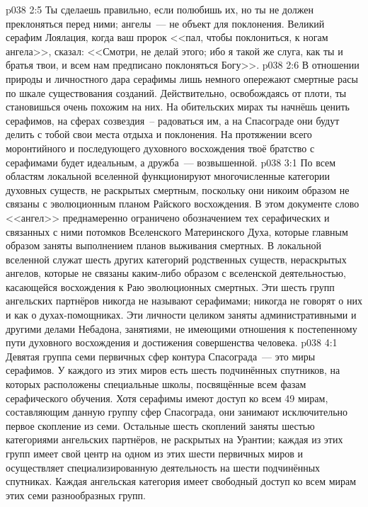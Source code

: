 \vs p038 2:5 \pc Ты сделаешь правильно, если полюбишь их, но ты не должен преклоняться перед ними; ангелы~--- не объект для поклонения. Великий серафим Лоялация, когда ваш пророк <<пал, чтобы поклониться, к ногам ангела>>, сказал: <<Смотри, не делай этого; ибо я такой же слуга, как ты и братья твои, и всем нам предписано поклоняться Богу>>.
\vs p038 2:6 В отношении природы и личностного дара серафимы лишь немного опережают смертные расы по шкале существования созданий. Действительно, освобождаясь от плоти, ты становишься очень похожим на них. На обительских мирах ты начнёшь ценить серафимов, на сферах созвездия~-- радоваться им, а на Спасограде они будут делить с тобой свои места отдыха и поклонения. На протяжении всего моронтийного и последующего духовного восхождения твоё братство с серафимами будет идеальным, а дружба~--- возвышенной.
\vs p038 3:1 По всем областям локальной вселенной функционируют многочисленные категории духовных существ, не раскрытых смертным, поскольку они никоим образом не связаны с эволюционным планом Райского восхождения. В этом документе слово <<ангел>> преднамеренно ограничено обозначением тех серафических и связанных с ними потомков Вселенского Материнского Духа, которые главным образом заняты выполнением планов выживания смертных. В локальной вселенной служат шесть других категорий родственных существ, нераскрытых ангелов, которые не связаны каким\hyp{}либо образом с вселенской деятельностью, касающейся восхождения к Раю эволюционных смертных. Эти шесть групп ангельских партнёров никогда не называют серафимами; никогда не говорят о них и как о духах\hyp{}помощниках. Эти личности целиком заняты административными и другими делами Небадона, занятиями, не имеющими отношения к постепенному пути духовного восхождения и достижения совершенства человека.
\vs p038 4:1 Девятая группа семи первичных сфер контура Спасограда~--- это миры серафимов. У каждого из этих миров есть шесть подчинённых спутников, на которых расположены специальные школы, посвящённые всем фазам серафического обучения. Хотя серафимы имеют доступ ко всем 49 мирам, составляющим данную группу сфер Спасограда, они занимают исключительно первое скопление из семи. Остальные шесть скоплений заняты шестью категориями ангельских партнёров, не раскрытых на Урантии; каждая из этих групп имеет свой центр на одном из этих шести первичных миров и осуществляет специализированную деятельность на шести подчинённых спутниках. Каждая ангельская категория имеет свободный доступ ко всем мирам этих семи разнообразных групп.
